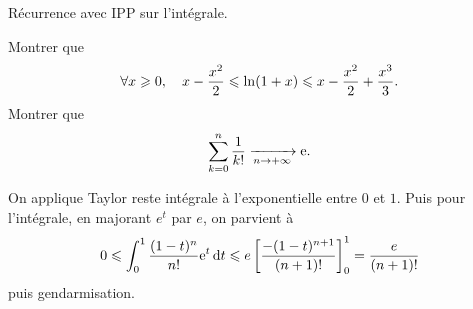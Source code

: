 \documentclass{magnolia}
\begin{document}
\begin{preuve}
Récurrence avec IPP sur l'intégrale.
\end{preuve}

\begin{exos}
\exo Montrer que
  \[\forall x\geqslant 0,\quad x-\frac{x^2}{2}\leqslant\ln(1+x)\leqslant x-\frac{x^2}{2}+\frac{x^3}{3}.\]
\exo[utile=2] Montrer que
  \[\sum_{k=0}^n \frac{1}{k!}\xrightarrow[n\rightarrow +\infty]{}{\rm e}.\]
  \begin{sol}
  On applique Taylor reste intégrale à l'exponentielle entre $0$ et $1$. Puis pour l'intégrale, en majorant $e^t$ par $e$, on parvient à $$0\leqslant \int_{0}^{1} \frac{(1-t)^n}{n!}{\rm e}^t\,\text{d}t\leqslant e\left[ \frac{-(1-t)^{n+1}}{(n+1)!} \right]_{0}^{1}=\frac{e}{(n+1)!}$$ puis gendarmisation.
  \end{sol}
    
\end{exos}
\end{document}
